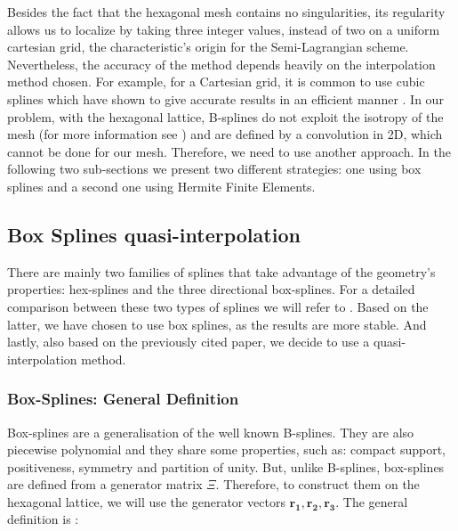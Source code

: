 \documentclass[proc]{edpsmath}
\begin{document}
Besides the fact that the hexagonal mesh contains no singularities, its regularity allows us to localize by taking three integer values, instead of two on a uniform cartesian grid, the characteristic's origin for the Semi-Lagrangian scheme. Nevertheless, the accuracy of the method depends heavily on the interpolation method chosen. For example, for a Cartesian grid, it is common to use cubic splines which have shown to give accurate results in an efficient manner \cite{Sonnendrucker1999201}. In our problem, with the hexagonal lattice, B-splines do not exploit the isotropy of the mesh (for more information see \cite{Mersereau79-IEEE}) and are defined by a convolution in 2D, which cannot be done for our mesh. Therefore, we need to use another approach. In the following two sub-sections we present two different strategies: one using box splines and a second one using Hermite Finite Elements.


\subsection{Box Splines quasi-interpolation}

There are mainly two families of  splines that take advantage of the geometry's properties: hex-splines and the three directional box-splines. For a detailed comparison between these two types of splines we will refer to \cite{Condat2007}. Based on the latter, we have chosen to use box splines, as the results are more stable. And lastly, also based on the previously cited paper, we decide to use a quasi-interpolation method.

\subsubsection{Box-Splines: General Definition}

Box-splines are a generalisation of the well known B-splines. They are also piecewise polynomial and they share some properties, such as: compact support, positiveness, symmetry and partition of unity. But, unlike B-splines, box-splines are defined from a generator matrix $\Xi$. Therefore, to construct them on the hexagonal lattice, we will use the generator vectors $\mathbf{r_1, r_2, r_3}$. The general definition is \cite{Boor1993, Condat2006}:
\end{document}
